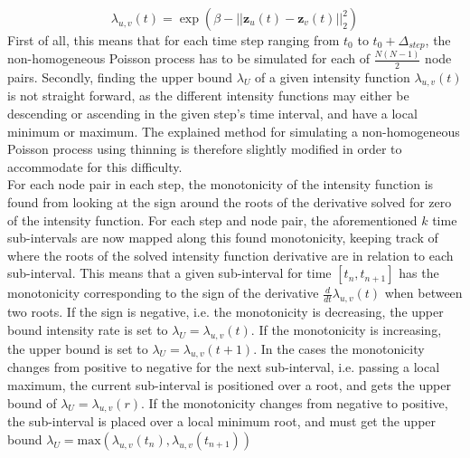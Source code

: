 \begin{equation}
    \lambda_{u,v}(t)
    =
    \exp \left(\beta - ||\textbf{z}_u(t) - \textbf{z}_v(t)||_2^2\right)
    \label{eq:IntensityFunc2}
\end{equation}
\noindent
First of all, this means that for each time step ranging from $t_0$ to $t_0 + \Delta_{step}$, the non-homogeneous Poisson process has to be simulated for each of $\frac{N(N-1)}{2}$ node pairs.
\noindent
Secondly, finding the upper bound $\lambda_U$ of a given intensity function $\lambda_{u,v}(t)$ is not straight forward, as the different intensity functions may either be descending or ascending in the given step's time interval, and have a local minimum or maximum.
The explained method for simulating a non-homogeneous Poisson process using thinning is therefore slightly modified in order to accommodate for this difficulty.
\\
For each node pair in each step, the monotonicity of the intensity function is found from looking at the sign around the roots of the derivative solved for zero of the intensity function.
For each step and node pair, the aforementioned $k$ time sub-intervals are now mapped along this found monotonicity, keeping track of where the roots of the solved intensity function derivative are in relation to each sub-interval.
This means that a given sub-interval for time $[t_n,t_{n+1}]$ has the monotonicity corresponding to the sign of the derivative $\frac{d}{dt} \lambda_{u,v}(t)$ when between two roots.
If the sign is negative, i.e. the monotonicity is decreasing, the upper bound intensity rate is set to $\lambda_U = \lambda_{u,v}(t)$.
If the monotonicity is increasing, the upper bound is set to $\lambda_U = \lambda_{u,v}(t+1)$.
In the cases the monotonicity changes from positive to negative for the next sub-interval, i.e. passing a local maximum, the current sub-interval is positioned over a root, and gets the upper bound of $\lambda_U = \lambda_{u,v}(r)$.
If the monotonicity changes from negative to positive, the sub-interval is placed over a local minimum root, and must get the upper bound $\lambda_U = \text{max}(\lambda_{u,v}(t_n), \lambda_{u,v}(t_{n+1}))$
